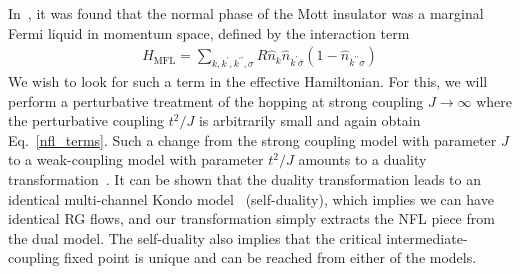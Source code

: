 \documentclass[12pt]{revtex4-2}
\begin{document}
In~\cite{anirbanurg1}, it was found that the normal phase of the Mott insulator was a marginal Fermi liquid in momentum space, defined by the interaction term 
\begin{equation}\begin{aligned}
	\label{mfl_urg}
	H_\text{MFL} = \sum_{k,k^\prime,k^{\prime\prime},\sigma}R \hat n_{k} \hat n_{k^\prime \overline\sigma}\left(1 - \hat n_{k^{\prime\prime}\sigma}\right) 
\end{aligned}\end{equation}
We wish to look for such a term in the effective Hamiltonian. For this, we will perform a perturbative treatment of the hopping at strong coupling \(J \to \infty\) where the perturbative coupling \(t^2/J\) is arbitrarily small and again obtain Eq.~\ref{nfl_terms}. Such a change from the strong coupling model with parameter \(J\) to a weak-coupling model with parameter \(t^2/J\) amounts to a duality transformation~\cite{kroha_kolf_2007,zitko_fabrizio_2017}. It can be shown that the duality transformation leads to an identical multi-channel Kondo model~\cite{kroha_kolf_2007} (self-duality), which implies we can have identical RG flows, and our transformation simply extracts the NFL piece from the dual model. The self-duality also implies that the critical intermediate-coupling fixed point is unique and can be reached from either of the models.
\end{document}

